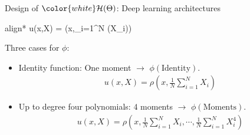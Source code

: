 \documentclass[aspectratio=169,10pt]{beamer}
\newcommand{\emphcolor}[1]{\textbf{\textcolor{emphcolorval}{#1}}}
\begin{document}
	
	
	

	\begin{frame}{Design of $\color{white}\mathcal{H}(\Theta)$: Deep learning architectures}
	\begin{empheq}[box=\tcbhighmath]{align*}
	 	u(x,X) = \rho \left(x,\sum_{i=1}^N \phi(X_i)\right)
	\end{empheq}
	Three cases for $\phi$:\vspace{0.1in}
	\begin{itemize}
	\item Identity function: One moment $\rightarrow$ $\phi(\text{Identity})$.\vspace{0.1in}
	\begin{align*}
		u(x,X) = \rho\left(x,\frac{1}{N}\sum_{i=1}^N X_i\right)
	\end{align*}
	\item Up to degree four polynomials: $4$ moments $\rightarrow$ $\phi(\text{Moments})$.
	\begin{align*}
		u(x,X) = \rho\left(x,\frac{1}{N}\sum_{i=1}^N X_i,\cdots  ,\frac{1}{N}\sum_{i=1}^N X^4_i\right)
	\end{align*}
	\end{itemize}
	
\end{frame}
	
\end{document}
